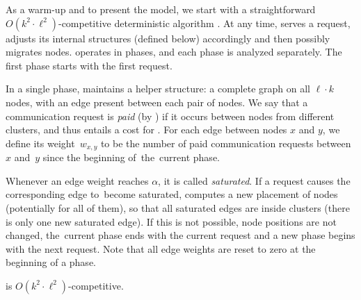 As a warm-up and to present the model, we start with a straightforward $O(k^2
\cdot \ell^2)$-competitive deterministic algorithm \DET. At any time, \DET
serves a request, adjusts its internal structures (defined below)
accordingly and then possibly migrates nodes. \DET operates in phases, and each
phase is analyzed separately. The first phase starts with the first request.

In a single phase, \DET maintains a helper structure: a complete graph on all
$\ell \cdot k$ nodes, with an edge present between each pair of nodes. We say
that a communication request is \emph{paid} (by \DET) if it occurs between
nodes from different clusters, and thus entails a cost for \DET. For each edge
between nodes $x$ and $y$, we define its weight~$w_{x,y}$ to be the number of
paid communication requests between $x$ and~$y$ since the beginning of~the~current phase.

Whenever an edge weight reaches $\alpha$, it is called \emph{saturated}. If a
request causes the corresponding edge to~become saturated,
\DET computes a new placement of nodes (potentially for all of them), so that all
saturated edges are inside clusters (there is only one new saturated edge). If
this is not possible, node positions are not changed, the~current phase ends
with the current request and a new phase begins with the next request. Note
that all edge weights are reset to zero at the beginning of a phase.


\begin{theorem}
\DET is $O(k^2 \cdot \ell^2)$-competitive.
\end{theorem}

